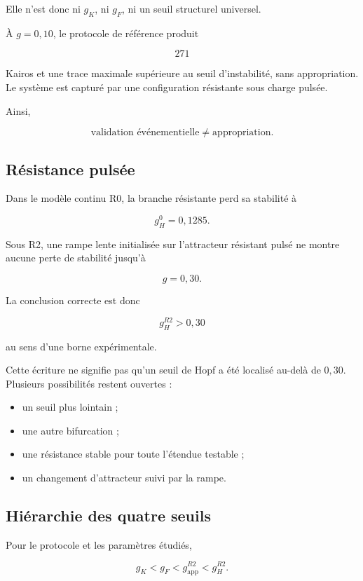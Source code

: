 Elle n'est donc ni \(g_K\), ni \(g_F\), ni un seuil structurel
universel.

À \(g=0{,}10\), le protocole de référence produit

\[
271
\]

Kairos et une trace maximale supérieure au seuil d'instabilité, sans
appropriation. Le système est capturé par une configuration résistante
sous charge pulsée.

Ainsi,

\[
\boxed{
\text{validation événementielle}
\neq
\text{appropriation}.
}
\]

\subsection{Résistance pulsée}
\label{annexe-r2-resistance-pulsee}

Dans le modèle continu R0, la branche résistante perd sa stabilité à

\[
g_H^0=0{,}1285.
\]

Sous R2, une rampe lente initialisée sur l'attracteur résistant pulsé
ne montre aucune perte de stabilité jusqu'à

\[
g=0{,}30.
\]

La conclusion correcte est donc

\[
\boxed{
g_H^{R2}>0{,}30
}
\]

au sens d'une borne expérimentale.

Cette écriture ne signifie pas qu'un seuil de Hopf a été localisé
au-delà de \(0{,}30\). Plusieurs possibilités restent ouvertes :

\begin{itemize}
\item
  un seuil plus lointain ;
\item
  une autre bifurcation ;
\item
  une résistance stable pour toute l'étendue testable ;
\item
  un changement d'attracteur suivi par la rampe.
\end{itemize}

\subsection{Hiérarchie des quatre seuils}
\label{annexe-r2-hierarchie}

Pour le protocole et les paramètres étudiés,

\[
\boxed{
g_K
<
g_F
<
g_{\mathrm{app}}^{R2}
<
g_H^{R2}.
}
\]

